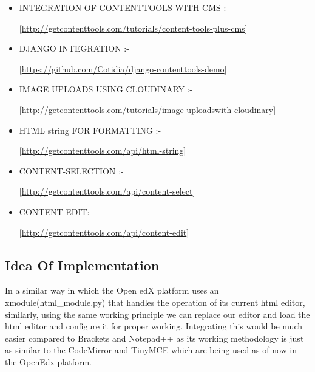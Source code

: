 \begin{itemize}
\begin{center}
[\url{http://getcontenttools.com/tutorials/multilingual-support}]
\end{center}
\item INTEGRATION OF CONTENTTOOLS WITH CMS :- \newline
\begin{center}
[\url{http://getcontenttools.com/tutorials/content-tools-plus-cms}]
\end{center}
\item DJANGO INTEGRATION :- \newline
\begin{center}
[\url{https://github.com/Cotidia/django-contenttools-demo}]
\end{center}
\item IMAGE UPLOADS USING CLOUDINARY :- \newline
\begin{center}
[\url{http://getcontenttools.com/tutorials/image-uploadswith-cloudinary}]
\end{center}
\item HTML string FOR FORMATTING :- \newline
\begin{center}
[\url{http://getcontenttools.com/api/html-string}]
\end{center}
\item CONTENT-SELECTION :- \newline
\begin{center}
[\url{http://getcontenttools.com/api/content-select}]
\end{center}
\item CONTENT-EDIT:- \newline
\begin{center}
[\url{http://getcontenttools.com/api/content-edit}]
\end{center}
\end{itemize}
\subsection{Idea Of Implementation}
In a similar way in which the Open edX platform uses an xmodule(html\_module.py) that
handles the operation of its current html editor, similarly, using the same working principle
we can replace our editor and load the html editor and configure it for proper working.  \newline
\newline
Integrating this would be much easier compared to Brackets and Notepad++ as its working
methodology is just as similar to the CodeMirror and TinyMCE which are being used as of
now in the OpenEdx platform. \newline
